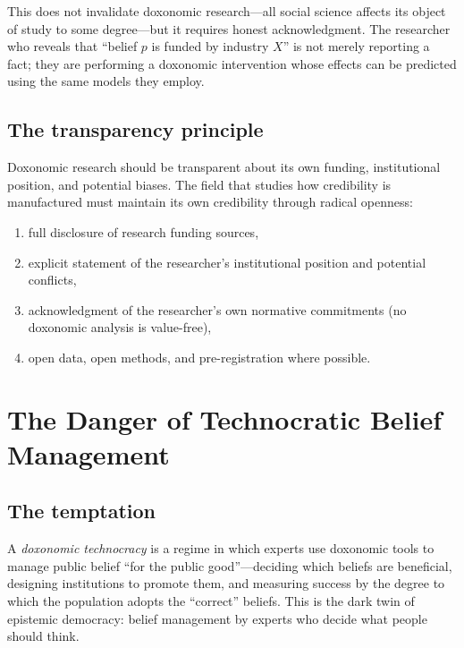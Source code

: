 This does not invalidate doxonomic research---all social science affects its object of study to some degree---but it requires honest acknowledgment.
The researcher who reveals that ``belief $p$ is funded by industry $X$'' is not merely reporting a fact; they are performing a doxonomic intervention whose effects can be predicted using the same models they employ.

\subsection{The transparency principle}

\begin{principle}
\label{prin:transparency}
Doxonomic research should be transparent about its own funding, institutional position, and potential biases.
The field that studies how credibility is manufactured must maintain its own credibility through radical openness:
\begin{enumerate}[nosep]
  \item full disclosure of research funding sources,
  \item explicit statement of the researcher's institutional position and potential conflicts,
  \item acknowledgment of the researcher's own normative commitments (no doxonomic analysis is value-free),
  \item open data, open methods, and pre-registration where possible.
\end{enumerate}
\end{principle}

\section{The Danger of Technocratic Belief Management}
\label{sec:ch34-technocracy}

\subsection{The temptation}

\begin{definition}
\label{def:doxonomic-technocracy}
A \emph{doxonomic technocracy} is a regime in which experts use doxonomic tools to manage public belief ``for the public good''---deciding which beliefs are beneficial, designing institutions to promote them, and measuring success by the degree to which the population adopts the ``correct'' beliefs.
This is the dark twin of epistemic democracy: belief management by experts who decide what people should think.
\end{definition}

